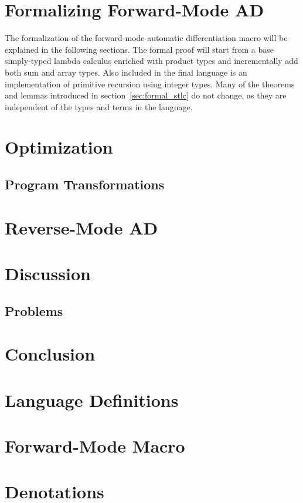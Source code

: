 \documentclass[11pt, final]{article}
\begin{document}

\newpage

% 

\setcounter{page}{3}
\tableofcontents
\newpage

% 


% 
% 
% 
% 
% 

\section{Formalizing Forward-Mode AD}
  The formalization of the forward-mode automatic differentiation macro will be explained in the following sections.
  The formal proof will start from a base simply-typed lambda calculus enriched with product types and incrementally add both sum and array types.
  Also included in the final language is an implementation of primitive recursion using integer types.
  Many of the theorems and lemmas introduced in section~\ref{sec:formal_stlc} do not change, as they are independent of the types and terms in the language.

  
  
  
\section{Optimization}
  \subsection{Program Transformations}
\section{Reverse-Mode AD}
\section{Discussion}
  \subsection{Problems}
  
\section{Conclusion}

\appendix
\section{Language Definitions}
\section{Forward-Mode Macro}
\section{Denotations}
\printbibliography
\makeatother
\end{document}
